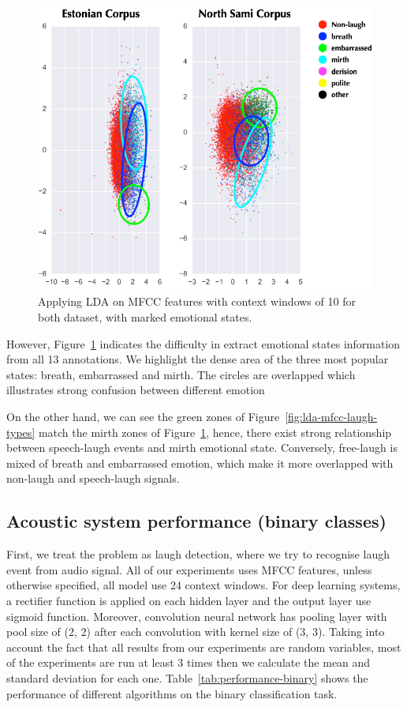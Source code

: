 \documentclass[10pt,journal,compsoc]{IEEEtran}
\begin{document}
\begin{figure}[!t]
\centering
\includegraphics[width=1\linewidth]{images/LDA-MFCC-emotional-states.png}
\caption{Applying LDA on MFCC features with context windows of 10 for both dataset, with marked emotional states.}
\label{fig:lda-mfcc-emotional-states}
\end{figure}

However, Figure~\ref{fig:lda-mfcc-emotional-states} indicates the difficulty in extract emotional states information from all 13 annotations. We highlight the dense area of the three most popular states: breath, embarrassed and mirth. The circles are overlapped which illustrates strong confusion between different emotion

On the other hand, we can see the green zones of Figure~\ref{fig:lda-mfcc-laugh-types} match the mirth zones of Figure~\ref{fig:lda-mfcc-emotional-states}, hence, there exist strong relationship between speech-laugh events and mirth emotional state. Conversely, free-laugh is mixed of breath and embarrassed emotion, which make it more overlapped with non-laugh and speech-laugh signals.


\subsection{Acoustic system performance (binary classes)}
\label{sec:acoustic-performance-binary}

First, we treat the problem as laugh detection, where we try to recognise laugh event from audio signal. All of our experiments uses MFCC features, unless otherwise specified, all model use 24 context windows. For deep learning systems, a rectifier function is applied on each hidden layer and the output layer use sigmoid function. Moreover, convolution neural network has pooling layer with pool size of (2, 2) after each convolution with kernel size of (3, 3). Taking into account the fact that all results from our experiments are random variables, most of the experiments are run at least 3 times then we calculate the mean and standard deviation for each one. Table~\ref{tab:performance-binary} shows the performance of different algorithms on the binary classification task.
\end{document}
